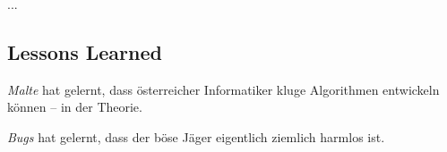   ...

  \subsection{Lessons Learned}

  \begin{lessonlearned}
    \emph{Malte} hat gelernt, dass österreicher Informatiker kluge 
    Algorithmen entwickeln können -- in der Theorie.
  \end{lessonlearned}

  \begin{lessonlearned}
    \emph{Bugs} hat gelernt, dass der böse Jäger eigentlich 
    ziemlich harmlos ist.
  \end{lessonlearned}
